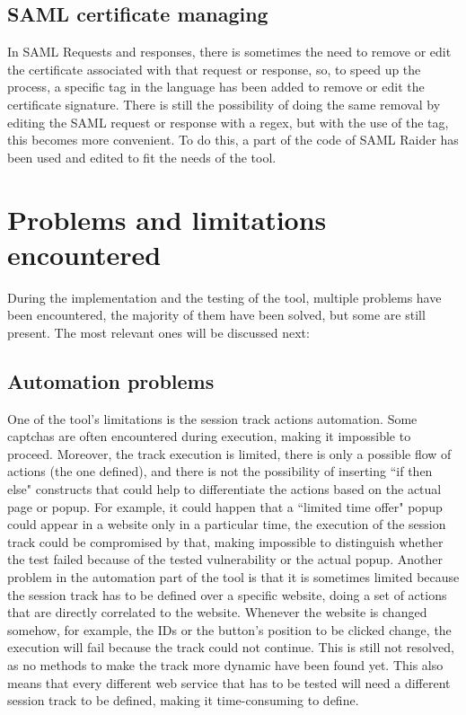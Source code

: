 \subsection{SAML certificate managing}
In \Gls{SAML} Requests and responses, there is sometimes the need to remove or edit the certificate associated with that request or response, so, to speed up the process, a specific tag in the language has been added to remove or edit the certificate signature. There is still the possibility of doing the same removal by editing the \Gls{SAML} request or response with a regex, but with the use of the tag, this becomes more convenient.
To do this, a part of the code of SAML Raider \cite{saml_raider} has been used and edited to fit the needs of the tool.

\section{Problems and limitations encountered}
\label{sec:limitations}
During the implementation and the testing of the tool, multiple problems have been encountered, the majority of them have been solved, but some are still present. The most relevant ones will be discussed next:

\subsection{Automation problems}
One of the tool's limitations is the session track actions automation. Some captchas are often encountered during execution, making it impossible to proceed. Moreover, the track execution is limited, there is only a possible flow of actions (the one defined), and there is not the possibility of inserting ``if then else" constructs that could help to differentiate the actions based on the actual page or popup. For example, it could happen that a ``limited time offer" popup could appear in a website only in a particular time, the execution of the session track could be compromised by that, making impossible to distinguish whether the test failed because of the tested vulnerability or the actual popup.
Another problem in the automation part of the tool is that it is sometimes limited because the session track has to be defined over a specific website, doing a set of actions that are directly correlated to the website. Whenever the website is changed somehow, for example, the IDs or the button's position to be clicked change, the execution will fail because the track could not continue.
This is still not resolved, as no methods to make the track more dynamic have been found yet. This also means that every different web service that has to be tested will need a different session track to be defined, making it time-consuming to define. 

